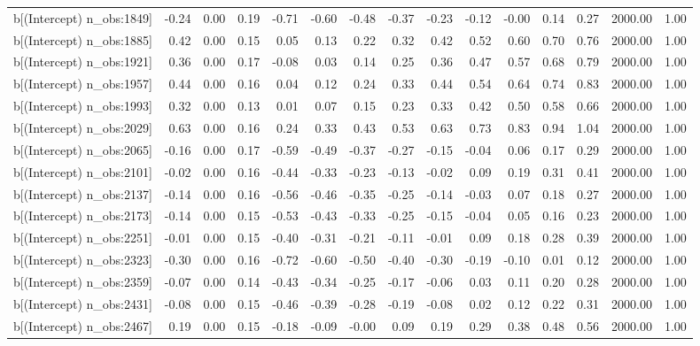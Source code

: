 \begin{table}[ht]
\begin{tabular}{rrrrrrrrrrrrrrr}
  b[(Intercept) n\_obs:1849] & -0.24 & 0.00 & 0.19 & -0.71 & -0.60 & -0.48 & -0.37 & -0.23 & -0.12 & -0.00 & 0.14 & 0.27 & 2000.00 & 1.00 \\ 
  b[(Intercept) n\_obs:1885] & 0.42 & 0.00 & 0.15 & 0.05 & 0.13 & 0.22 & 0.32 & 0.42 & 0.52 & 0.60 & 0.70 & 0.76 & 2000.00 & 1.00 \\ 
  b[(Intercept) n\_obs:1921] & 0.36 & 0.00 & 0.17 & -0.08 & 0.03 & 0.14 & 0.25 & 0.36 & 0.47 & 0.57 & 0.68 & 0.79 & 2000.00 & 1.00 \\ 
  b[(Intercept) n\_obs:1957] & 0.44 & 0.00 & 0.16 & 0.04 & 0.12 & 0.24 & 0.33 & 0.44 & 0.54 & 0.64 & 0.74 & 0.83 & 2000.00 & 1.00 \\ 
  b[(Intercept) n\_obs:1993] & 0.32 & 0.00 & 0.13 & 0.01 & 0.07 & 0.15 & 0.23 & 0.33 & 0.42 & 0.50 & 0.58 & 0.66 & 2000.00 & 1.00 \\ 
  b[(Intercept) n\_obs:2029] & 0.63 & 0.00 & 0.16 & 0.24 & 0.33 & 0.43 & 0.53 & 0.63 & 0.73 & 0.83 & 0.94 & 1.04 & 2000.00 & 1.00 \\ 
  b[(Intercept) n\_obs:2065] & -0.16 & 0.00 & 0.17 & -0.59 & -0.49 & -0.37 & -0.27 & -0.15 & -0.04 & 0.06 & 0.17 & 0.29 & 2000.00 & 1.00 \\ 
  b[(Intercept) n\_obs:2101] & -0.02 & 0.00 & 0.16 & -0.44 & -0.33 & -0.23 & -0.13 & -0.02 & 0.09 & 0.19 & 0.31 & 0.41 & 2000.00 & 1.00 \\ 
  b[(Intercept) n\_obs:2137] & -0.14 & 0.00 & 0.16 & -0.56 & -0.46 & -0.35 & -0.25 & -0.14 & -0.03 & 0.07 & 0.18 & 0.27 & 2000.00 & 1.00 \\ 
  b[(Intercept) n\_obs:2173] & -0.14 & 0.00 & 0.15 & -0.53 & -0.43 & -0.33 & -0.25 & -0.15 & -0.04 & 0.05 & 0.16 & 0.23 & 2000.00 & 1.00 \\ 
  b[(Intercept) n\_obs:2251] & -0.01 & 0.00 & 0.15 & -0.40 & -0.31 & -0.21 & -0.11 & -0.01 & 0.09 & 0.18 & 0.28 & 0.39 & 2000.00 & 1.00 \\ 
  b[(Intercept) n\_obs:2323] & -0.30 & 0.00 & 0.16 & -0.72 & -0.60 & -0.50 & -0.40 & -0.30 & -0.19 & -0.10 & 0.01 & 0.12 & 2000.00 & 1.00 \\ 
  b[(Intercept) n\_obs:2359] & -0.07 & 0.00 & 0.14 & -0.43 & -0.34 & -0.25 & -0.17 & -0.06 & 0.03 & 0.11 & 0.20 & 0.28 & 2000.00 & 1.00 \\ 
  b[(Intercept) n\_obs:2431] & -0.08 & 0.00 & 0.15 & -0.46 & -0.39 & -0.28 & -0.19 & -0.08 & 0.02 & 0.12 & 0.22 & 0.31 & 2000.00 & 1.00 \\ 
  b[(Intercept) n\_obs:2467] & 0.19 & 0.00 & 0.15 & -0.18 & -0.09 & -0.00 & 0.09 & 0.19 & 0.29 & 0.38 & 0.48 & 0.56 & 2000.00 & 1.00 \\ 

\end{tabular}
\end{table}
